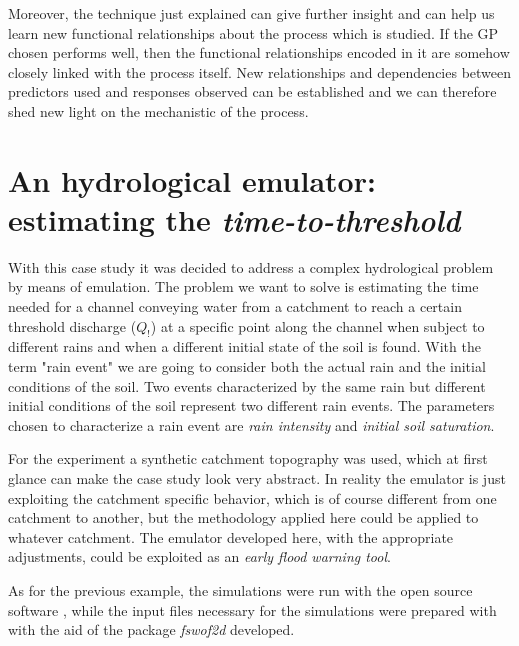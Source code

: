 Moreover, the technique just explained can give further insight and can help us learn new functional relationships about the process which is studied.
If the GP chosen performs well, then the functional relationships encoded in it are somehow closely linked with the process itself.
New relationships and dependencies between predictors used and responses observed can be established and we can therefore shed new light on the mechanistic of the process.


\newpage

\section{An hydrological emulator: estimating the \textit{time-to-threshold}}
\label{sec:hydrological_emulator}

With this case study it was decided to address a complex hydrological problem by means of emulation.
The problem we want to solve is estimating the time needed for a channel conveying water from a catchment to reach a certain threshold discharge ($Q_!$) at a specific point along the channel when subject to different rains and when a different initial state of the soil is found.
With the term "rain event" we are going to consider both the actual rain and the initial conditions of the soil.
Two events characterized by the same rain but different initial conditions  of the soil represent two different rain events. The parameters chosen to characterize a rain event are \emph{rain intensity} and \emph{initial soil saturation}.

For the experiment a synthetic catchment topography was used, which at first glance can make the case study look very abstract.
In reality the emulator is just exploiting the catchment specific behavior, which is of course different from one catchment to another, but the methodology applied here could be applied to whatever catchment.
The emulator developed here, with the appropriate adjustments, could be exploited as an \emph{early flood warning tool}.

As for the previous example, the simulations were run with the open source software , while the input files necessary for the simulations were prepared with  with the aid of the package \textit{fswof2d} developed.


